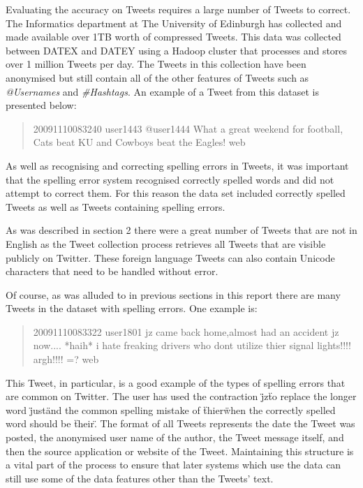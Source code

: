Evaluating the accuracy on Tweets requires a large number of Tweets to correct. The Informatics department at The University of Edinburgh has collected and made available over 1TB worth of compressed Tweets\cite{}. This data was collected between DATEX and DATEY using a Hadoop cluster \cite{} that processes and stores over 1 million Tweets per day. The Tweets in this collection have been anonymised but still contain all of the other features of Tweets such as \emph{@Usernames} and \emph{#Hashtags}. An example of a Tweet from this dataset is presented below:

\begin{quote}
20091110083240 user1443 @user1444 What a great weekend for football, Cats beat KU and Cowboys beat the Eagles! web
\end{quote}

As well as recognising and correcting spelling errors in Tweets, it was important that the spelling error system recognised correctly spelled words and did not attempt to correct them. For this reason the data set included correctly spelled Tweets as well as Tweets containing spelling errors.

As was described in section 2 there were a great number of Tweets that are not in English as the Tweet collection process retrieves all Tweets that are visible publicly on Twitter. These foreign language Tweets can also contain Unicode characters that need to be handled without error.

Of course, as was alluded to in previous sections in this report there are many Tweets in the dataset with spelling errors. One example is:

\begin{quote}
20091110083322 user1801 jz came back home,almost had an accident jz now.... *haih* i hate freaking drivers who dont utilize thier signal lights!!!! argh!!!! =? web
\end{quote}

This Tweet, in particular, is a good example of the types of spelling errors that are common on Twitter. The user has used the contraction \"jz\" to replace the longer word \"just\" and the common spelling mistake of \"thier\" when the correctly spelled word should be \"their\". The format of all Tweets represents the date the Tweet was posted, the anonymised user name of the author, the Tweet message itself, and then the source application or website of the Tweet. Maintaining this structure is a vital part of the process to ensure that later systems which use the data can still use some of the data features other than the Tweets' text.


